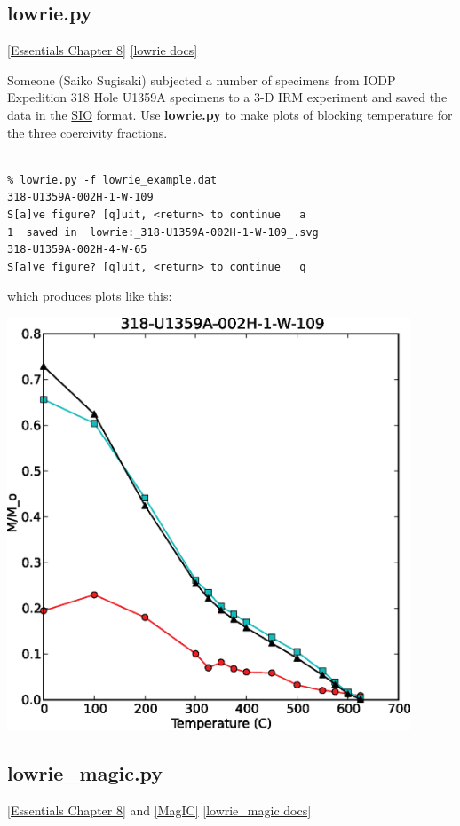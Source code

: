 \documentclass[11pt]{book}
\begin{document}
{{{
\subsection{lowrie.py}
\href{http://magician.ucsd.edu/Essentials_2/WebBook2ch8.html#lowrie}{[Essentials Chapter 8]}
\href{http://earthref.org/PmagPy/pmagpydocs/lowrie-module.html}{[lowrie docs]}

Someone (Saiko Sugisaki) subjected a number of specimens from IODP Expedition 318 Hole U1359A specimens to a 3-D IRM experiment and saved the data in the \href{#sio_magic.py}{SIO} format.   
Use {\bf lowrie.py} to make plots of blocking temperature for the three  coercivity fractions.  

\begin{verbatim}

% lowrie.py -f lowrie_example.dat
318-U1359A-002H-1-W-109
S[a]ve figure? [q]uit, <return> to continue   a
1  saved in  lowrie:_318-U1359A-002H-1-W-109_.svg
318-U1359A-002H-4-W-65
S[a]ve figure? [q]uit, <return> to continue   q
\end{verbatim}

which produces plots like this:

\includegraphics[width=12cm]{EPSfiles/lowrie.eps}

\subsection{lowrie\_magic.py}
\href{http://magician.ucsd.edu/Essentials_2/WebBook2ch8.html#lowrie}{[Essentials Chapter 8]} and \href{#MagIC}{[MagIC]}
\href{http://earthref.org/PmagPy/pmagpydocs/lowrie_magic-module.html}{[lowrie\_magic docs]}

}}}
\end{document}
